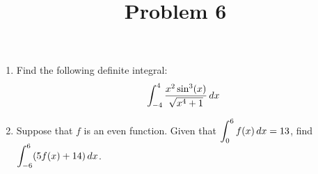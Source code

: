 \documentclass{ximera}
\title[Problem 6]{Problem 6}
\begin{document}
\begin{abstract} \end{abstract}
\maketitle

\begin{problem}

  \begin{enumerate}
    \item Find the following definite integral:
        \[ \displaystyle \int_{-4}^4 \frac{x^2 \sin^3(x)}{\sqrt{x^4 + 1}} \,d x \]

\item Suppose that $f$ is an even function. Given that $\displaystyle \int_0^6 f(x) \,d x = 13$, find $\displaystyle \int_{-6}^6 (5f(x) + 14) \,d x$.
          
\end{enumerate}
\end{problem}
\end{document}
